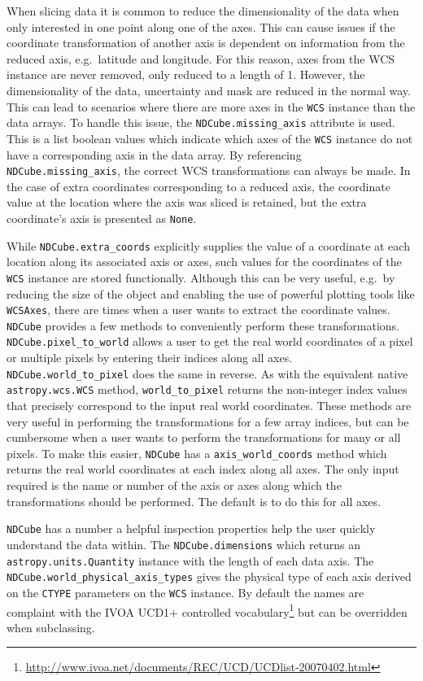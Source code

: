When slicing data it is common to reduce the dimensionality of the data when only interested in one point along one of the axes.
This can cause issues if the coordinate transformation of another axis is dependent on information from the reduced axis, e.g.\ latitude and longitude.
For this reason, axes from the WCS instance are never removed, only reduced to a length of 1.
However, the dimensionality of the data, uncertainty and mask are reduced in the normal way.  
This can lead to scenarios where there are more axes in the \texttt{WCS} instance than the data arrays.
To handle this issue, the \texttt{NDCube.missing\_axis} attribute is used.
This is a list boolean values which indicate which axes of the \texttt{WCS} instance do not have a corresponding axis in the data array.  
By referencing \texttt{NDCube.missing\_axis}, the correct WCS transformations can always be made.
In the case of extra coordinates corresponding to a reduced axis, the coordinate value at the location where the axis was sliced is retained, but the extra coordinate's axis is presented as \texttt{None}.

While \texttt{NDCube.extra\_coords} explicitly supplies the value of a coordinate at each location along its associated axis or axes, such values for the coordinates of the \texttt{WCS} instance are stored functionally.
Although this can be very useful, e.g.\ by reducing the size of the object and enabling the use of powerful plotting tools like \texttt{WCSAxes}, there are times when a user wants to extract the coordinate values.
\texttt{NDCube} provides a few methods to conveniently perform these transformations.
\texttt{NDCube.pixel\_to\_world} allows a user to get the real world coordinates of a pixel or multiple pixels by entering their indices along all axes.  \texttt{NDCube.world\_to\_pixel} does the same in reverse.  As with the equivalent native \texttt{astropy.wcs.WCS} method, \texttt{world\_to\_pixel} returns the non-integer index values that precisely correspond to the input real world coordinates.  These methods are very useful in performing the transformations for a few array indices, but can be cumbersome when a user wants to perform the transformations for many or all pixels.  To make this easier, \texttt{NDCube} has a \texttt{axis\_world\_coords} method which returns the real world coordinates at each index along all axes.
The only input required is the name or number of the axis or axes along which the transformations should be performed.  The default is to do this for all axes.

\texttt{NDCube} has a number a helpful inspection properties help the user quickly understand the data within.  The \texttt{NDCube.dimensions} which returns an \texttt{astropy.units.Quantity} instance with the length of each data axis.
The \texttt{NDCube.world\_physical\_axis\_types} gives the physical type of each axis derived on the \texttt{CTYPE} parameters on the \texttt{WCS} instance.  By default the names are complaint with the IVOA UCD1+ controlled vocabulary\footnote{\url{http://www.ivoa.net/documents/REC/UCD/UCDlist-20070402.html}} but can be overridden when subclassing.

